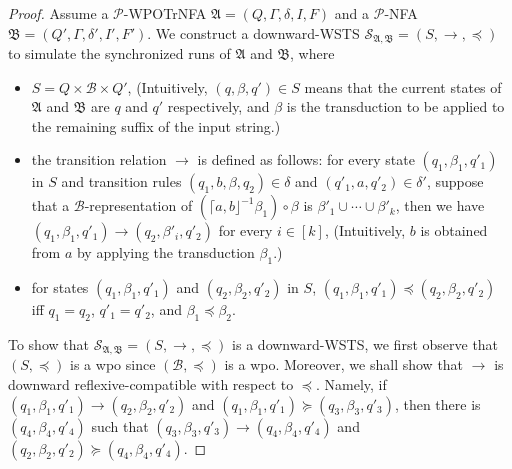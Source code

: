 \documentclass[preprint,12pt]{elsarticle}
\newcommand\Pp{{\mathcal{P} }}
\newcommand\Aut{{\mathfrak{A} }}
\newcommand\AutB{{\mathfrak{B} }}
\newcommand\TranSet{{\mathscr{T} }}
\newcommand\Tranbasis{{\mathscr{B} }}
\newcommand{\WOTrPDS}{\textsf{WPOTrPDS}}
\newcommand{\WOTrNFA}{\textsf{WPOTrNFA}}
\newcommand{\NFA}{\textsf{NFA}}
\newcommand{\wstsnodes}{\mathscr{S}}
\begin{document}
\begin{proof}
Assume a $\Pp$-{\WOTrNFA} $\Aut = (Q, \Gamma, \delta, I, F)$ and a $\Pp$-{\NFA} $\AutB = (Q', \Gamma, \delta', I', F')$.
We construct a downward-WSTS $\wstsnodes_{\Aut,\AutB} = (S, \rightarrow, \preceq)$ 
%
to simulate the synchronized runs of $\Aut$ and $\AutB$, where
\begin{itemize}
	\item $S = Q \times \Tranbasis \times Q'$, (Intuitively, $(q, \beta, q') \in S$ means that the current states of $\Aut$ and $\AutB$ are $q$ and $q'$ respectively, and $\beta$ is the transduction to be applied to the remaining suffix of the input string.)
	\item the transition relation $\xrightarrow{}$ is defined as follows:  for every state $(q_1, \beta_1, q'_1)$ in $S$ and transition rules $(q_1, b, \beta, q_2) \in \delta$ and $(q'_1, a, q'_2) \in \delta'$, suppose that a $\Tranbasis$-representation of $( \lceil a, b \rfloor^{-1} \beta_1) \circ \beta$ is $\beta'_1 \cup \cdots \cup \beta'_k$,  then we have $(q_1, \beta_1, q'_1) \xrightarrow{} (q_2, \beta'_i, q'_2)$ for every $i \in [k]$, (Intuitively, $b$ is obtained from $a$ by applying the transduction $\beta_1$.)
%	
	\item for states $(q_1, \beta_1, q'_1)$ and $(q_2, \beta_2, q'_2)$ in $S$, $(q_1, \beta_1, q'_1) \preceq (q_2, \beta_2, q'_2)$ iff $q_1= q_2$, $q'_1 = q'_2$, and $\beta_1 \preceq \beta_2$.
\end{itemize}

To show that $\wstsnodes_{\Aut,\AutB} = (S, \rightarrow, \preceq)$ is a downward-WSTS, we first observe that $(S, \preceq)$ is a wpo since $(\Tranbasis, \preceq)$ is a wpo. Moreover, we shall show that $\rightarrow$ is downward reflexive-compatible with respect to $\preceq$. Namely, if $(q_1, \beta_1, q'_1) \rightarrow (q_2, \beta_2, q'_2)$ and $(q_1, \beta_1, q'_1) \succeq (q_3, \beta_3, q'_3)$, then there is $(q_4, \beta_4, q'_4)$ such that $(q_3, \beta_3, q'_3) \rightarrow (q_4, \beta_4, q'_4)$ and $(q_2, \beta_2, q'_2) \succeq (q_4, \beta_4, q'_4)$. 


\end{proof}
\end{document}
